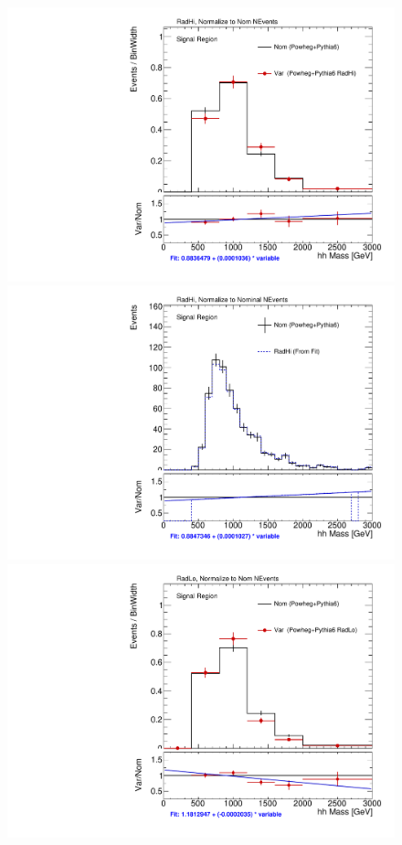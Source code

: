 \begin{figure}[!htbp]
\begin{center}
\includegraphics[scale=0.33]{./figures/boosted/systematics/ttbar_alt_hhMass_SR_RadHi_rebin} 
\includegraphics[scale=0.33]{./figures/boosted/systematics/ttbar_fromfit_hhMass_SR_RadHi}  \\
\includegraphics[scale=0.33]{./figures/boosted/systematics/ttbar_alt_hhMass_SR_RadLo_rebin}

\end{center}
\end{figure}
